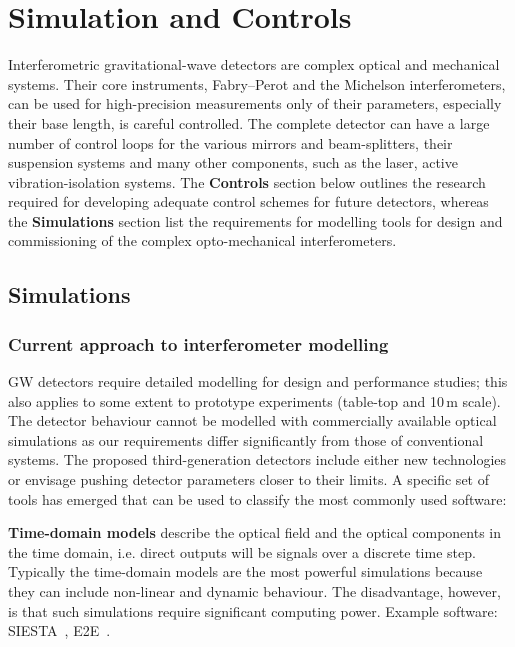 \chapter{Simulation and Controls}
\label{sec:Sim_Controls}

Interferometric gravitational-wave detectors are complex optical and mechanical systems. Their core instruments, Fabry–Perot and the Michelson interferometers, can be used for high-precision measurements only of their parameters, especially their base length, is careful controlled. 
The complete detector can have a large number of control loops for the various mirrors and beam-splitters, their suspension systems and many other components, such as the laser, active vibration-isolation systems. The \textbf{Controls} section below outlines the research required for developing adequate control schemes for future detectors, whereas the \textbf{Simulations} section list the requirements for modelling tools for design and commissioning of the complex opto-mechanical interferometers.

\section{Simulations}
\subsection{Current approach to interferometer modelling}
GW detectors require detailed modelling for design and performance studies; this also applies to some extent to prototype experiments (table-top and 10\,m scale). The detector behaviour cannot be modelled with commercially available optical simulations as our requirements differ significantly from those of conventional systems. The proposed third-generation detectors include either new technologies or envisage pushing detector parameters closer to their limits. 
A specific set of tools has emerged that can be used to classify the most commonly used software:

\textbf{Time-domain models} describe the optical field and the optical components in the time domain, i.e. direct outputs will be signals over a discrete time step. Typically the time-domain models are the most powerful   simulations because they can include non-linear and dynamic behaviour.
The disadvantage, however, is that such simulations require significant computing power. Example software: SIESTA~\cite{SIESTA}, E2E~\cite{e2e_2000}.

